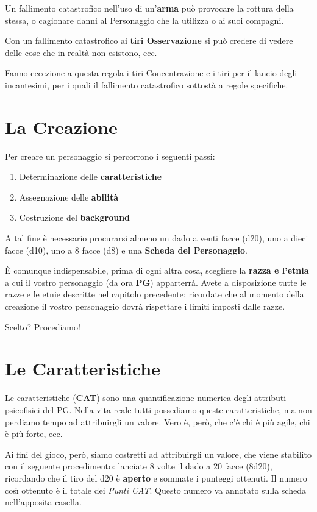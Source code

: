 \iffullversion
Un fallimento catastrofico nell'uso di un'\textbf{arma} pu\`o
provocare la rottura della stessa, o cagionare danni al Personaggio
che la utilizza o ai suoi compagni.

Con un fallimento catastrofico ai \textbf{tiri Osservazione} si pu\`o
credere di vedere delle cose che in realt\`a non esistono, ecc.

Fanno eccezione a questa regola i tiri Concentrazione e i tiri per il
lancio degli incantesimi, per i quali il fallimento catastrofico
sottost\`a a regole specifiche.
\fi

\section{La Creazione}
\label{creazione}

Per creare un personaggio si percorrono i seguenti passi:
\begin{enumerate}
  \itemsep -6pt
\item Determinazione delle \textbf{caratteristiche}
\item Assegnazione delle \textbf{abilit\`a}
\item Costruzione del \textbf{background}
\end{enumerate}

A tal fine \`e necessario procurarsi almeno un dado a venti facce
(d20), uno a dieci facce (d10), uno a 8 facce (d8) e una \textbf{Scheda del
Personaggio}.

\`E comunque indispensabile, prima di ogni altra cosa, scegliere la
\textbf{razza e l'etnia} a cui il vostro personaggio (da ora
\textbf{PG}) apparterr\`a. Avete a disposizione tutte le razze e le
etnie descritte nel capitolo precedente; ricordate che al momento
della creazione il vostro personaggio dovr\`a rispettare i limiti
imposti dalle razze.

Scelto? Procediamo!

\section{Le Caratteristiche}

Le caratteristiche (\textbf{CAT}) sono una quantificazione numerica
degli attributi psicofisici del PG.  Nella vita reale tutti possediamo
queste caratteristiche, ma non perdiamo tempo ad attribuirgli un
valore. Vero \`e, per\`o, che c'\`e chi \`e pi\`u agile, chi
\`e pi\`u forte, ecc.

Ai fini del gioco, per\`o, siamo costretti ad attribuirgli un valore,
che viene stabilito con il seguente procedimento: lanciate 8 volte il
dado a 20 facce (8d20), ricordando che il tiro del d20 \`e \textbf{aperto}
e sommate i punteggi ottenuti.
Il numero cos\`{\i} ottenuto \`e il totale dei
\emph{Punti CAT}. Questo numero va annotato sulla scheda nell'apposita
casella.

